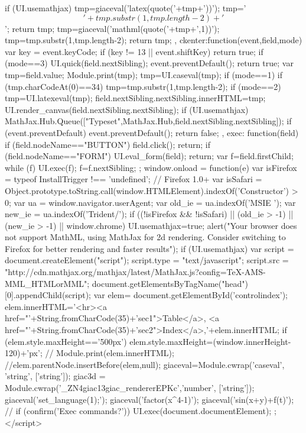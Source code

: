 {{{{     if (UI.usemathjax){
       tmp=giaceval('latex(quote('+tmp+'))');
       tmp='$$'+tmp.substr(1,tmp.length-2)+'$$';
       return tmp;
     }
     tmp=giaceval('mathml(quote('+tmp+',1))');
     tmp=tmp.substr(1,tmp.length-2);
    return tmp;   
  },
  ckenter:function(event,field,mode){
    var key = event.keyCode;
    if (key != 13 || event.shiftKey) return true;
   if (mode==3){ UI.quick(field.nextSibling); event.preventDefault(); return true; }
    var tmp=field.value;
   Module.print(tmp);
    tmp=UI.caseval(tmp);
    if (mode==1){
      if (tmp.charCodeAt(0)==34) tmp=tmp.substr(1,tmp.length-2); 
   }
   if (mode==2){
     tmp=UI.latexeval(tmp);
   }
   field.nextSibling.nextSibling.innerHTML=tmp;
   UI.render_canvas(field.nextSibling.nextSibling);
   if (UI.usemathjax) MathJax.Hub.Queue(["Typeset",MathJax.Hub,field.nextSibling.nextSibling]);
   if (event.preventDefault) event.preventDefault();
    return false;
  },
   exec: function(field){
     if (field.nodeName=="BUTTON"){
        field.click();
        return;
     }
     if (field.nodeName=="FORM"){
        UI.eval_form(field);
        return;
     }
     var f=field.firstChild;
     while (f){
       UI.exec(f);
       f=f.nextSibling;
     }
   }
 };
 window.onload = function(e){
   var isFirefox = typeof InstallTrigger !== 'undefined';   // Firefox 1.0+
   var isSafari = Object.prototype.toString.call(window.HTMLElement).indexOf('Constructor') > 0;
  var ua = window.navigator.userAgent;
  var old_ie = ua.indexOf('MSIE ');
  var new_ie = ua.indexOf('Trident/');
  if ((!isFirefox && !isSafari) || (old_ie > -1) || (new_ie > -1) || window.chrome){
     UI.usemathjax=true;
     alert("Your browser does not support MathML, using MathJax for 2d rendering. Consider switching to Firefox for better rendering and faster results");
  }
  if (UI.usemathjax){
    var script = document.createElement("script");
    script.type = "text/javascript";
    script.src  = "http://cdn.mathjax.org/mathjax/latest/MathJax.js?config=TeX-AMS-MML_HTMLorMML";
    document.getElementsByTagName("head")[0].appendChild(script);
  }
  var elem= document.getElementById('controlindex');
  elem.innerHTML='<hr><a href="'+String.fromCharCode(35)+'sec1">Table</a>, <a href="'+String.fromCharCode(35)+'sec2">Index</a>,'+elem.innerHTML;
  if (elem.style.maxHeight=='500px')
    elem.style.maxHeight=(window.innerHeight-120)+'px';
  // Module.print(elem.innerHTML);
  //elem.parentNode.insertBefore(elem,null);
  giaceval=Module.cwrap('caseval',  'string', ['string']);
  giac3d = Module.cwrap('_ZN4giac13giac_rendererEPKc','number', ['string']);
  giaceval('set_language(1);');
  giaceval('factor(x^4-1)');
  giaceval('sin(x+y)+f(t)');
 // if (confirm('Exec commands?')) UI.exec(document.documentElement);
 };
</script>
}
\fi
}
